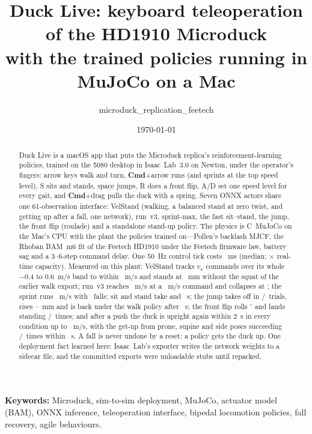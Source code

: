 \documentclass[11pt]{article}
\title{Duck Live: keyboard teleoperation of the HD1910 Microduck\\ with the trained policies running in MuJoCo on a Mac}
\author{microduck\_replication\_feetech}
\date{\today}
\newcommand{\cmdkey}{\textsf{\textbf{Cmd}}}      %
\begin{document}
\sloppy
\maketitle

\begin{abstract}
Duck Live is a macOS app that puts the Microduck replica's reinforcement-learning policies, trained on the 5080
desktop in Isaac~Lab~3.0 on Newton, under the operator's fingers: arrow keys walk and turn, \cmdkey+arrow runs
(and sprints at the top speed level), S sits and stands, space jumps, R does a front flip, A/D set one speed level
for every gait, and \cmdkey+drag pulls the duck with a spring. Seven ONNX actors share one 61-observation
interface: VelStand (walking, a balanced stand at zero twist, and getting up after a fall, one network), run~v3,
sprint-max, the fast sit--stand, the jump, the front flip (roulade) and a standalone stand-up policy. The physics is
C~MuJoCo on the Mac's CPU with the plant the policies trained on---Pollen's backlash MJCF, the Rhoban BAM~m6 fit of
the Feetech HD1910 under the Feetech firmware law, battery sag and a 3--6-step command delay. One 50~Hz control tick
costs \stepMedian~ms (median; \stepCapacity$\times$ real-time capacity). Measured on this plant: VelStand tracks
$v_x$ commands over its whole $-0.4$ to $0.6$~m/s band to within \walkMaxErr~m/s and stands at \standZ~mm without the
squat of the earlier walk export; run~v3 reaches \runTopAch~m/s at a \runTopCmd~m/s command and collapses at
\runFallCmds; the sprint runs \sprintAch~m/s with \sprintFalls~falls; sit and stand take
\sitSettleMean and \standUpMean~s; the jump takes off in \jumpTakeoff/\jumpN~trials, rises
\jumpRiseMin--\jumpRiseMax~mm and is back under the walk policy after \jumpBackMean~s; the front flip rolls
\rollDegMean$^\circ$ and lands standing \rollStanding/\rollN~times; and after a push the duck is upright again
within 2~s in every condition up to \pushAllUpright~m/s, with the get-up from prone, supine and side poses succeeding
\getupSuccess/\getupTrials~times within \getupMaxS~s. A fall is never undone by a reset: a policy gets the duck up. One
deployment fact learned here: Isaac~Lab's exporter writes the network weights to a sidecar file, and the committed
exports were unloadable stubs until repacked.
\end{abstract}

\par\smallskip\noindent\textbf{Keywords:} Microduck, sim-to-sim deployment, MuJoCo, actuator model (BAM), ONNX
inference, teleoperation interface, bipedal locomotion policies, fall recovery, agile behaviours.\par\smallskip
\end{document}

